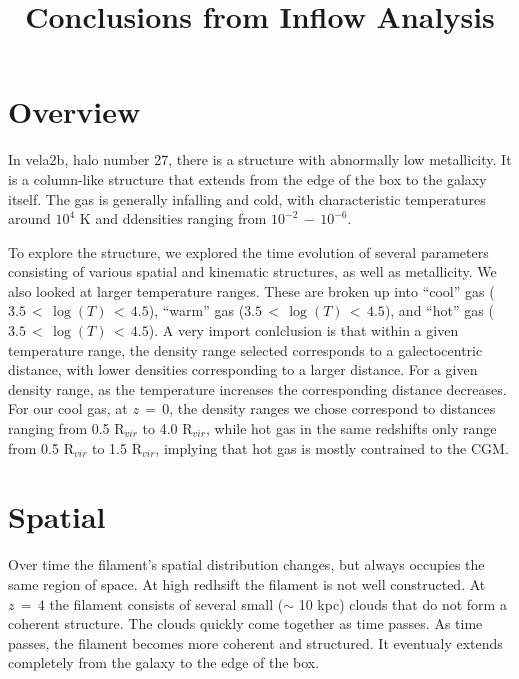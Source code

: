 \documentclass{article}
\title{Conclusions from Inflow Analysis}
\begin{document}
\maketitle



\section{Overview}

In vela2b, halo number 27, there is a structure with abnormally low
metallicity.  It is a column-like structure that extends from the edge of the 
box to the galaxy itself. The gas is generally infalling and cold, with  
characteristic temperatures around $10^4$ K and ddensities ranging from 
$10^{-2}\,-\,10^{-6}$.


To explore the structure, we explored the time evolution of several parameters
consisting of various spatial and kinematic structures, as well as metallicity.
We also looked at larger temperature ranges. These are broken up into ``cool''
gas ($3.5\,<\,\log(T)\,<\,4.5$), ``warm'' gas ($3.5\,<\,\log(T)\,<\,4.5$), and
``hot'' gas ($3.5\,<\,\log(T)\,<\,4.5$). A very import conlclusion is that
within a given temperature range, the density range selected corresponds to a
galectocentric distance, with lower densities corresponding to a larger
distance. For a given density range, as the temperature increases the
corresponding distance decreases. For our cool gas, at $z\,=\,0$, the density
ranges we chose correspond to distances ranging from 0.5 R$_{vir}$ to 4.0
R$_{vir}$, while hot gas in the same redshifts only range from 0.5 R$_{vir}$
to 1.5 R$_{vir}$, implying that hot gas is mostly contrained to the CGM. 



\section{Spatial}
Over time the filament's spatial distribution changes, but always occupies the same 
region of space. At high redhsift the filament is not well constructed. At $z\,=\,4$
the filament consists of several small ($\sim$ 10 kpc) clouds that do not form a
coherent structure. The clouds quickly come together as time passes. As time
passes, the filament becomes more coherent and structured. It eventualy extends
completely from the galaxy to the edge of the box. 
\end{document}
